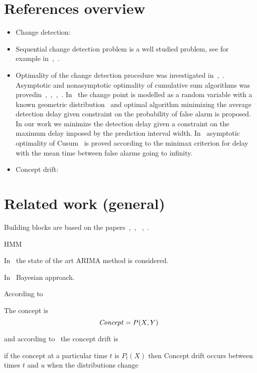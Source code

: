 \documentclass[12 pt]{article}
\begin{document}
\section{References overview}
\begin{itemize}
  \item Change detection:~\cite{basseville1993detection}
  \item Sequential change detection problem is a well studied problem, see for example in~\cite{tartakovsky2014sequential},~\cite{plasse2021streaming}.

  \item Optimality of the change detection procedure was investigated in~\cite{Page1954},~\cite{Shiryaev2010,Shiryaev1961,Shiryaev1963}.
  Asymptotic and nonasymptotic optimality of cumulative sum algorithms was provedin~\cite{lorden1971procedures},~\cite{moustakides1986optimal},~\cite{moustakides2004optimality},~\cite{ritov1990decision}. In~\cite{Shiryaev1963,shiryaev2007optimal} the change point is modelled as a random variable with a known geometric distribution~\cite{veeravalli2014quickest} and optimal algorithm minimizing the average detection delay given constraint on the probability of false alarm is proposed. In our work we minimize the detection delay given a constraint on the maximum delay imposed by the prediction interval width. In~\cite{lorden1971procedures} asymptotic optimality of Cusum~\cite{Page1954} is proved according to the minimax criterion for delay with the mean time between false alarms going to infinity.

  \item Concept drift:
\end{itemize}

\section{Related work (general)}
Building blocks are based on the papers~\cite{mackay2007},~\cite{Chapados2014},~\cite{Rasmussen2010} ,~\cite{MacKay_Inference_Book}.

HMM~\cite{HMMtutor}

In~\cite{Box_Jenkins_Arima} the state of the art ARIMA method is considered.

In~\cite{mackay2007} Bayesian approach.


According to~\cite{GamaAsurveyOnConceptDrift} 
\begin{definition}
   The concept is
   \begin{equation}
   \text{\textit{Concept}} = P(X,Y)
   \end{equation}    
\end{definition}
and according to~\cite{WebbConceptDrift} the concept drift is
\begin{definition}
   if the concept at a particular time $t$ is $P_t(X)$ then Concept drift occurs between times $t$ and $u$ when the distributions change
   \label{def:concept_drift}    
\end{definition}



  
  
\end{document}

